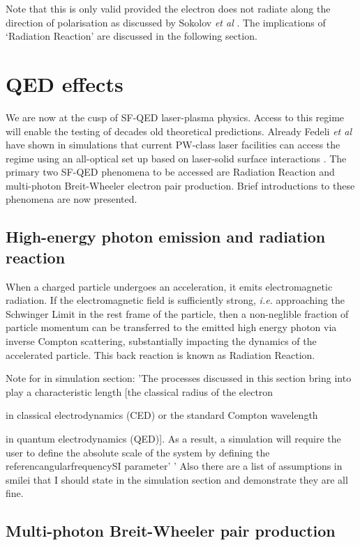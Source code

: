 Note that this is only valid provided the electron does not radiate along the direction of polarisation as discussed by Sokolov \textit{et al} \cite{sokolovDynamicsEmittingElectrons2009}. The implications of `Radiation Reaction' are discussed in the following section.

\section{QED effects}
We are now at the cusp of \ac{SF-QED} laser-plasma physics. Access to this regime will enable the testing of decades old theoretical predictions. Already Fedeli \textit{et al} have shown in simulations that current PW-class laser facilities can access the regime using an all-optical set up based on laser-solid surface interactions \cite{fedeliProbingStrongfieldQED2020}. The primary two SF-QED phenomena to be accessed are Radiation Reaction and multi-photon Breit-Wheeler electron pair production. Brief introductions to these phenomena are now presented.


\subsection{High-energy photon emission and radiation reaction}
When a charged particle undergoes an acceleration, it emits electromagnetic radiation. If the electromagnetic field is sufficiently strong, \textit{i.e.} approaching the Schwinger Limit in the rest frame of the particle, then a non-neglible fraction of particle momentum can be transferred to the emitted high energy photon via inverse Compton scattering, substantially impacting the dynamics of the accelerated particle. This back reaction is known as Radiation Reaction.



Note for in simulation section: 'The processes discussed in this section bring into play a characteristic length [the classical radius of the electron 

in classical electrodynamics (CED) or the standard Compton wavelength 

in quantum electrodynamics (QED)]. As a result, a simulation will require the user to define the absolute scale of the system by defining the referencangularfrequencySI parameter' '
Also there are a list of assumptions in smilei that I should state in the simulation section and demonstrate they are all fine.

\subsection{Multi-photon Breit-Wheeler pair production}

